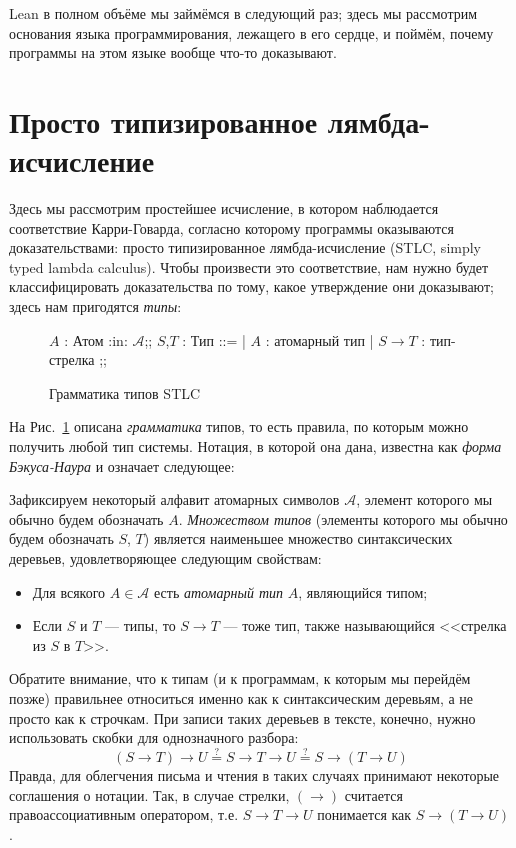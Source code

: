 Lean в полном объёме мы займёмся в следующий раз; здесь
мы рассмотрим основания языка программирования, лежащего
в его сердце, и поймём, почему программы на этом языке
вообще что-то доказывают.

\section{Просто типизированное лямбда-исчисление}

Здесь мы рассмотрим простейшее исчисление, в котором
наблюдается соответствие Карри-Говарда, согласно
которому программы оказываются доказательствами: просто
типизированное лямбда-исчисление (STLC, simply typed
lambda calculus). Чтобы произвести это соответствие, нам
нужно будет классифицировать доказательства по тому,
какое утверждение они доказывают; здесь нам пригодятся
\emph{типы}:

\begin{figure}[ht]
    \centering
    \begin{bnf}
        $A$ : \textsf{Атом} :in: $\mathcal{A}$;;
        $S$,$T$ : \textsf{Тип} ::=
        | $A$ : атомарный тип
        | $S\to T$ : тип-стрелка
        ;;
    \end{bnf}
    \caption{Грамматика типов STLC}
    \label{stlc-types-grammar}
\end{figure}

На Рис.~\ref{stlc-types-grammar} описана
\emph{грамматика} типов, то есть правила, по которым
можно получить любой тип системы. Нотация, в которой она
дана, известна как \emph{форма Бэкуса-Наура} и означает
следующее:

\begin{definition}
    Зафиксируем некоторый алфавит атомарных символов
    $\mathcal{A}$, элемент которого мы обычно будем
    обозначать $A$. \emph{Множеством типов} (элементы
    которого мы обычно будем обозначать $S$, $T$)
    является наименьшее множество синтаксических
    деревьев, удовлетворяющее следующим свойствам:
    \begin{itemize}
        \item Для всякого $A\in\mathcal{A}$ есть
            \emph{атомарный тип} $A$, являющийся типом;
        \item Если $S$ и $T$ --- типы, то $S\to T$ ---
            тоже тип, также называющийся
            <<стрелка из $S$ в $T$>>.
    \end{itemize}
\end{definition}

Обратите внимание, что к типам (и к программам, к
которым мы перейдём позже) правильнее относиться именно
как к синтаксическим деревьям, а не просто как к
строчкам. При записи таких деревьев в тексте, конечно,
нужно использовать скобки для однозначного разбора:
\[
    (S\to T)\to U \stackrel{?}{=} S\to T\to U
    \stackrel{?}{=} S\to(T\to U)
\]
Правда, для облегчения письма и чтения в таких случаях
принимают некоторые соглашения о нотации. Так, в случае
стрелки, $(\to)$ считается правоассоциативным
оператором, т.е. $S\to T\to U$ понимается как
$S\to(T \to U)$.

